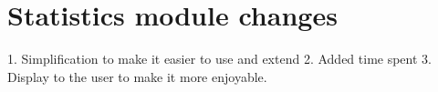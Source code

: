 \chapter{Statistics module changes}

1. Simplification to make it easier to use and extend
2. Added time spent
3. Display to the user to make it more enjoyable.